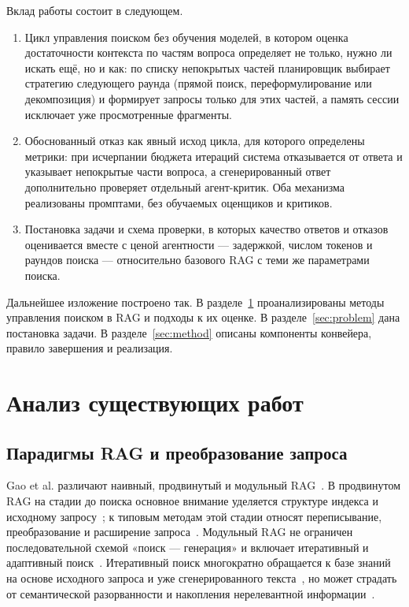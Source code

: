 \documentclass{misisarticle}
\begin{document}
Вклад работы состоит в следующем.
\begin{enumerate}[nosep]
  \item Цикл управления поиском без обучения моделей, в котором оценка достаточности контекста по частям вопроса определяет не только, нужно ли искать ещё, но и как: по списку непокрытых частей планировщик выбирает стратегию следующего раунда (прямой поиск, переформулирование или декомпозиция) и формирует запросы только для этих частей, а память сессии исключает уже просмотренные фрагменты.
  \item Обоснованный отказ как явный исход цикла, для которого определены метрики: при исчерпании бюджета итераций система отказывается от ответа и указывает непокрытые части вопроса, а сгенерированный ответ дополнительно проверяет отдельный агент-критик. Оба механизма реализованы промптами, без обучаемых оценщиков и критиков.
  \item Постановка задачи и схема проверки, в которых качество ответов и отказов оценивается вместе с ценой агентности --- задержкой, числом токенов и раундов поиска --- относительно базового RAG с теми же параметрами поиска.
\end{enumerate}

Дальнейшее изложение построено так.
В разделе~\ref{sec:related} проанализированы методы управления поиском в RAG и подходы к их оценке.
В разделе~\ref{sec:problem} дана постановка задачи.
В разделе~\ref{sec:method} описаны компоненты конвейера, правило завершения и реализация.

\section{Анализ существующих работ}\label{sec:related}

\subsection{Парадигмы RAG и преобразование запроса}

Gao et al. различают наивный, продвинутый и модульный RAG~\cite{gao2023retrieval}.
В продвинутом RAG на стадии до поиска основное внимание уделяется структуре индекса и исходному запросу~\cite{gao2023retrieval}; %
к типовым методам этой стадии относят переписывание, преобразование и расширение запроса~\cite{gao2023retrieval}. %
Модульный RAG не ограничен последовательной схемой «поиск --- генерация» и включает итеративный и адаптивный поиск~\cite{gao2023retrieval}. %
Итеративный поиск многократно обращается к базе знаний на основе исходного запроса и уже сгенерированного текста~\cite{gao2023retrieval}, %
но может страдать от семантической разорванности и накопления нерелевантной информации~\cite{gao2023retrieval}. %
\end{document}
